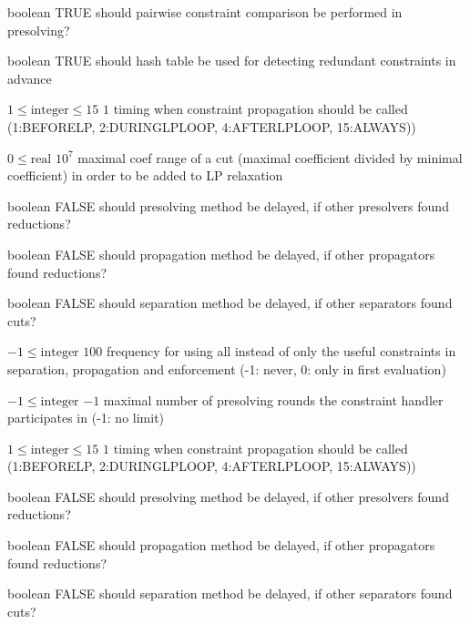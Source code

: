 %
{boolean}%
{TRUE}%
{should pairwise constraint comparison be performed in presolving?}%
{}

%
{boolean}%
{TRUE}%
{should hash table be used for detecting redundant constraints in advance}%
{}

%
{$1\leq\textrm{integer}\leq15$}%
{$1$}%
{timing when constraint propagation should be called (1:BEFORELP, 2:DURINGLPLOOP, 4:AFTERLPLOOP, 15:ALWAYS))}%
{}

%
{$0\leq\textrm{real}$}%
{$10^{  7}$}%
{maximal coef range of a cut (maximal coefficient divided by minimal coefficient) in order to be added to LP relaxation}%
{}

%
{boolean}%
{FALSE}%
{should presolving method be delayed, if other presolvers found reductions?}%
{}

%
{boolean}%
{FALSE}%
{should propagation method be delayed, if other propagators found reductions?}%
{}

%
{boolean}%
{FALSE}%
{should separation method be delayed, if other separators found cuts?}%
{}

%
{$-1\leq\textrm{integer}$}%
{$100$}%
{frequency for using all instead of only the useful constraints in separation, propagation and enforcement (-1: never, 0: only in first evaluation)}%
{}

%
{$-1\leq\textrm{integer}$}%
{$-1$}%
{maximal number of presolving rounds the constraint handler participates in (-1: no limit)}%
{}

%
{$1\leq\textrm{integer}\leq15$}%
{$1$}%
{timing when constraint propagation should be called (1:BEFORELP, 2:DURINGLPLOOP, 4:AFTERLPLOOP, 15:ALWAYS))}%
{}

%
{boolean}%
{FALSE}%
{should presolving method be delayed, if other presolvers found reductions?}%
{}

%
{boolean}%
{FALSE}%
{should propagation method be delayed, if other propagators found reductions?}%
{}

%
{boolean}%
{FALSE}%
{should separation method be delayed, if other separators found cuts?}%
{}

